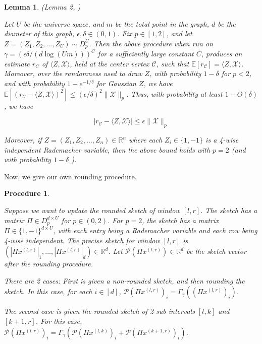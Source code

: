 \documentclass{article}
\theoremstyle{plain}
\newtheorem{lem}[theorem]{Lemma}
\newtheorem{procedure}[theorem]{Procedure}
\begin{document}
\begin{lem}\label{rounding} (Lemma 2, \cite{rounding})








    Let $U$ be the universe space, and $m$ be the total point in the graph, $d$ be the diameter of this graph, $\epsilon, \delta \in (0, 1)$. Fix $p \in[1,2]$, and let $Z=\left(Z_1, Z_2, \ldots, Z_U\right) \sim D_p^U$. Then the above procedure when run on $\gamma=(\epsilon \delta /(d \log (U m)))^C$ for a sufficiently large constant $C$, produces an estimate $r_C$ of $\langle Z, \mathcal{X}\rangle$, held at the center vertex $\mathcal{C}$, such that $\mathbb{E}\left[r_{\mathcal{C}}\right]=\langle Z, \mathcal{X}\rangle$. Moreover, over the randomness used to draw $Z$, with probability $1-\delta$ for $p<2$, and with probability $1-e^{-1 / \delta}$ for Gaussian $Z$, we have $\mathbb{E}\left[\left(r_{\mathcal{C}}-\langle Z, \mathcal{X}\rangle\right)^2\right] \leq(\epsilon / \delta)^2\|\mathcal{X}\|_p$. Thus, with probability at least $1-O(\delta)$, we have

$$
\left|r_{\mathcal{C}}-\langle Z, \mathcal{X}\rangle\right| \leq \epsilon\|\mathcal{X}\|_p
$$


Moreover, if $Z=\left(Z_1, Z_2, \ldots, Z_n\right) \in \mathbb{R}^n$ where each $Z_i \in\{1,-1\}$ is a 4-wise independent Rademacher variable, then the above bound holds with $p=2$ (and with probability $1-\delta$ ).
\end{lem}

Now, we give our own rounding procedure. 


\begin{procedure} \label{rounding procedure}

Suppose we want to update the rounded sketch of window $[l, r]$. The sketch has a matrix $\Pi \in D_p ^ {d\times U}$ for $p \in (0, 2)$. For $p = 2$, the sketch has a matrix  $\Pi \in \{1, -1\} ^ {d\times U}$, with each entry being a Rademacher variable and each row being 4-wise independent. The precise sketch for window $[l, r]$ is $(|\Pi x ^ {(l,r)}|_1, \dots, |\Pi x ^ {(l,r)}|_d) \in \mathbb{R} ^ d$. Let $\mathcal{P}(\Pi x ^ {(l,r)}) \in \mathbb{R} ^ d$ be the sketch vector after the rounding procedure. 

There are 2 cases: First is given a non-rounded sketch, and then rounding the sketch. In this case, for each $i\in [d]$, $\mathcal{P}(\Pi x ^ {(l,r)})_i = \Gamma_{\gamma} ((\Pi x ^ {(l,r)})_i)$.

The second case is given the rounded sketch of 2 sub-intervals $[l, k]$ and $[k+1, r]$. For this case, $\mathcal{P}(\Pi x ^ {(l,r)})_i = \Gamma_{\gamma}(\mathcal{P}(\Pi x ^ {(l,k)})_i + \mathcal{P}(\Pi x ^ {(k+1,r)})_i)$.
\end{procedure}
\end{document}
